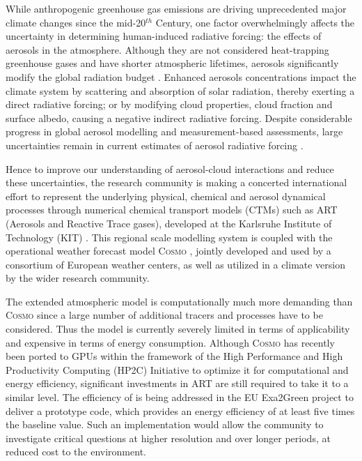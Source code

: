 While anthropogenic greenhouse gas emissions are driving unprecedented
major  climate changes  since  the mid-20$^{th}$  Century, one  factor
overwhelmingly  affects the  uncertainty in  determining human-induced
radiative  forcing:  the  effects   of  aerosols  in  the  atmosphere.
Although they  are not  considered heat-trapping greenhouse  gases and
have shorter atmospheric  lifetimes, aerosols significantly modify the
global   radiation   budget   \cite{IPCC-2013}.    Enhanced   aerosols
concentrations impact the climate  system by scattering and absorption
of solar radiation, thereby exerting a direct radiative forcing; or by
modifying cloud properties, cloud fraction and surface albedo, causing
a negative indirect  radiative forcing.  Despite considerable progress
in  global aerosol  modelling  \cite{Mann-2013} and  measurement-based
assessments,  large  uncertainties  remain  in  current  estimates  of
aerosol  radiative   forcing  \cite{Myhre-2013,  IPCC-2013,  Lee-2013,
Sherwood-2013, Stier-2013}.

Hence to  improve our understanding of  aerosol-cloud interactions and
reduce  these  uncertainties,  the  research  community  is  making  a
concerted international  effort to represent  the underlying physical,
chemical  and aerosol dynamical  processes through  numerical chemical
transport  models (CTMs)  such  as ART  (Aerosols  and Reactive  Trace
gases),   developed   at  the   Karlsruhe   Institute  of   Technology
(KIT)  \cite{Vogel-2009,  Bangert-2011,  Knote-2013}.   This  regional
scale  modelling  system  is  coupled  with  the  operational  weather
forecast  model \textsc{Cosmo} \cite{Baldauf-2011},  jointly developed
and  used by  a consortium  of European  weather centers,  as  well as
utilized in a climate version by the wider research community.

The extended  atmospheric model \cosmoart  is com\-put\-ationally much
more demanding than \textsc{Cosmo}  since a large number of additional
tracers  and processes  have  to  be considered.   Thus  the model  is
currently severely limited in  terms of applicability and expensive in
terms  of energy  consumption.  Although  \textsc{Cosmo}  has recently
been  ported  to  GPUs  \cite{Gysi-2014, Lapillonne-2014}  within  the
framework  of the  High  Performance and  High Productivity  Computing
(HP2C)  Initiative \cite{HP2C}  to optimize  it for  computational and
energy efficiency,  significant investments in ART  are still required
to take it  to a similar level.  The efficiency  of \cosmoart is being
addressed in  the EU Exa2Green  project \cite{EXA2GREEN} to  deliver a
prototype code, which  provides an energy efficiency of  at least five
times  the baseline  value.  Such  an implementation  would  allow the
community to  investigate critical questions at  higher resolution and
over longer periods, at reduced cost to the environment.

